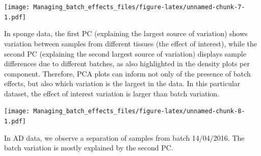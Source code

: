 \documentclass[]{book}
\newenvironment{Shaded}{\begin{snugshade}}{\end{snugshade}}
\newcommand{\KeywordTok}[1]{\textcolor[rgb]{0.13,0.29,0.53}{\textbf{#1}}}
\newcommand{\DataTypeTok}[1]{\textcolor[rgb]{0.13,0.29,0.53}{#1}}
\newcommand{\DecValTok}[1]{\textcolor[rgb]{0.00,0.00,0.81}{#1}}
\newcommand{\StringTok}[1]{\textcolor[rgb]{0.31,0.60,0.02}{#1}}
\newcommand{\CommentTok}[1]{\textcolor[rgb]{0.56,0.35,0.01}{\textit{#1}}}
\newcommand{\OperatorTok}[1]{\textcolor[rgb]{0.81,0.36,0.00}{\textbf{#1}}}
\newcommand{\NormalTok}[1]{#1}
\begin{document}
\texttt{[image: Managing\_batch\_effects\_files/figure-latex/unnamed-chunk-7-1.pdf]}

In sponge data, the first PC (explaining the largest source of
variation) shows variation between samples from different tissues (the
effect of interest), while the second PC (explaining the second largest
source of variation) displays sample differences due to different
batches, as also highlighted in the density plots per component.
Therefore, PCA plots can inform not only of the presence of batch
effects, but also which variation is the largest in the data. In this
particular dataset, the effect of interest variation is larger than
batch variation.

\begin{Shaded}
\end{Shaded}

\texttt{[image: Managing\_batch\_effects\_files/figure-latex/unnamed-chunk-8-1.pdf]}

In AD data, we observe a separation of samples from batch 14/04/2016.
The batch variation is mostly explained by the second PC.

\begin{Shaded}
\end{Shaded}
\end{document}
